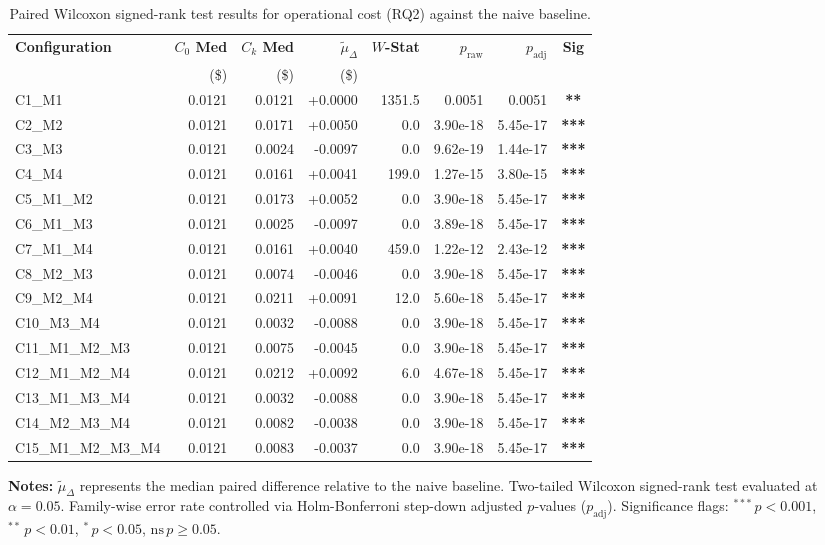 \begin{table}[!htbp]
\centering
\small
\caption{Paired Wilcoxon signed-rank test results for operational cost (RQ2) against the naive baseline.}
\label{tab:wilcoxon_rq2}
\begin{tabular*}{\textwidth}{@{\extracolsep{\fill}} l r r r r r r c @{}}
\toprule
\textbf{Configuration} & \textbf{$C_0$ Med} & \textbf{$C_k$ Med} & \textbf{$\tilde{\mu}_\Delta$} & \textbf{$W$-Stat} & \textbf{$p_{\text{raw}}$} & \textbf{$p_{\text{adj}}$} & \textbf{Sig} \\
 & \scriptsize{(\$)} & \scriptsize{(\$)} & \scriptsize{(\$)} & & & & \\
\midrule
C1\_M1 & 0.0121 & 0.0121 & +0.0000 & 1351.5 & 0.0051 & 0.0051 & \textbf{**} \\
C2\_M2 & 0.0121 & 0.0171 & +0.0050 & 0.0 & 3.90e-18 & 5.45e-17 & \textbf{***} \\
C3\_M3 & 0.0121 & 0.0024 & -0.0097 & 0.0 & 9.62e-19 & 1.44e-17 & \textbf{***} \\
C4\_M4 & 0.0121 & 0.0161 & +0.0041 & 199.0 & 1.27e-15 & 3.80e-15 & \textbf{***} \\
C5\_M1\_M2 & 0.0121 & 0.0173 & +0.0052 & 0.0 & 3.90e-18 & 5.45e-17 & \textbf{***} \\
C6\_M1\_M3 & 0.0121 & 0.0025 & -0.0097 & 0.0 & 3.89e-18 & 5.45e-17 & \textbf{***} \\
C7\_M1\_M4 & 0.0121 & 0.0161 & +0.0040 & 459.0 & 1.22e-12 & 2.43e-12 & \textbf{***} \\
C8\_M2\_M3 & 0.0121 & 0.0074 & -0.0046 & 0.0 & 3.90e-18 & 5.45e-17 & \textbf{***} \\
C9\_M2\_M4 & 0.0121 & 0.0211 & +0.0091 & 12.0 & 5.60e-18 & 5.45e-17 & \textbf{***} \\
C10\_M3\_M4 & 0.0121 & 0.0032 & -0.0088 & 0.0 & 3.90e-18 & 5.45e-17 & \textbf{***} \\
C11\_M1\_M2\_M3 & 0.0121 & 0.0075 & -0.0045 & 0.0 & 3.90e-18 & 5.45e-17 & \textbf{***} \\
C12\_M1\_M2\_M4 & 0.0121 & 0.0212 & +0.0092 & 6.0 & 4.67e-18 & 5.45e-17 & \textbf{***} \\
C13\_M1\_M3\_M4 & 0.0121 & 0.0032 & -0.0088 & 0.0 & 3.90e-18 & 5.45e-17 & \textbf{***} \\
C14\_M2\_M3\_M4 & 0.0121 & 0.0082 & -0.0038 & 0.0 & 3.90e-18 & 5.45e-17 & \textbf{***} \\
C15\_M1\_M2\_M3\_M4 & 0.0121 & 0.0083 & -0.0037 & 0.0 & 3.90e-18 & 5.45e-17 & \textbf{***} \\
\bottomrule
\end{tabular*}
\vspace{0.5em}
\parbox{\textwidth}{\footnotesize
\textbf{Notes:} $\tilde{\mu}_\Delta$ represents the median paired difference relative to the naive baseline. Two-tailed Wilcoxon signed-rank test evaluated at $\alpha = 0.05$. Family-wise error rate controlled via Holm-Bonferroni step-down adjusted $p$-values ($p_{\text{adj}}$). Significance flags: $^{***}\,p < 0.001$, $^{**}\,p < 0.01$, $^{*}\,p < 0.05$, $\text{ns}\,p \ge 0.05$.}
\end{table}
